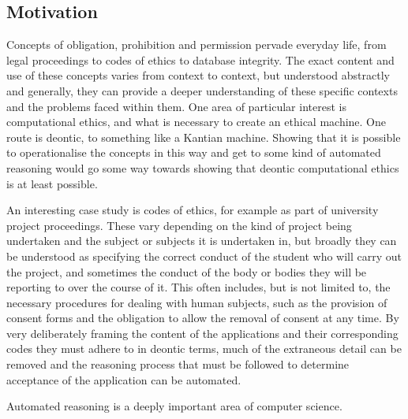\documentclass{l4proj}
\begin{document}
\subsection{Motivation}
Concepts of obligation, prohibition and permission pervade everyday life, from legal proceedings to codes of ethics to database integrity. The exact content and use of these concepts varies from context to context, but understood abstractly and generally, they can provide a deeper understanding of these specific contexts and the problems faced within them. One area of particular interest is computational ethics, and what is necessary to create an ethical machine. One route is deontic, to something like a Kantian machine\cite{Powers}. Showing that it is possible to operationalise the concepts in this way and get to some kind of automated reasoning would go some way towards showing that deontic computational ethics is at least possible. 

An interesting case study is codes of ethics, for example as part of university project proceedings. These vary depending on the kind of project being undertaken and the subject or subjects it is undertaken in, but broadly they can be understood as specifying the correct conduct of the student who will carry out the project, and sometimes the conduct of the body or bodies they will be reporting to over the course of it. This often includes, but is not limited to, the necessary procedures for dealing with human subjects, such as the provision of consent forms and the obligation to allow the removal of consent at any time. By very deliberately framing the content of the applications and their corresponding codes they must adhere to in deontic terms, much of the extraneous detail can be removed and the reasoning process that must be followed to determine acceptance of the application can be automated.

Automated reasoning is a deeply important area of computer science. 

\end{document}
